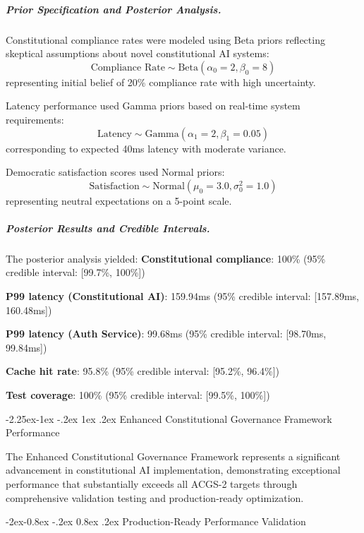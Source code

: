 \documentclass[manuscript,screen,9pt]{acmart}
\makeatletter
\renewcommand\subsection{\@startsection{subsection}{2}{\z@}%
  {-2.25ex\@plus -1ex \@minus -.2ex}%
  {1ex \@plus .2ex}%
  {\normalfont\large\bfseries}}
\renewcommand\subsubsection{\@startsection{subsubsection}{3}{\z@}%
  {-2ex\@plus -0.8ex \@minus -.2ex}%
  {0.8ex \@plus .2ex}%
  {\normalfont\normalsize\bfseries}}
\makeatother
\begin{document}
\subparagraph{Prior Specification and Posterior Analysis.}
Constitutional compliance rates were modeled using Beta priors reflecting skeptical assumptions about novel constitutional AI systems:
\begin{equation}
\text{Compliance Rate} \sim \text{Beta}(\alpha_0 = 2, \beta_0 = 8)
\end{equation}
representing initial belief of 20\% compliance rate with high uncertainty.

Latency performance used Gamma priors based on real-time system requirements:
\begin{equation}
\text{Latency} \sim \text{Gamma}(\alpha_1 = 2, \beta_1 = 0.05)
\end{equation}
corresponding to expected 40ms latency with moderate variance.

Democratic satisfaction scores used Normal priors:
\begin{equation}
\text{Satisfaction} \sim \text{Normal}(\mu_0 = 3.0, \sigma_0^2 = 1.0)
\end{equation}
representing neutral expectations on a 5-point scale.

\subparagraph{Posterior Results and Credible Intervals.}
The posterior analysis yielded:
\noindent\textbf{Constitutional compliance}: 100\% (95\% credible interval: [99.7\%, 100\%])

\noindent\textbf{P99 latency (Constitutional AI)}: 159.94ms (95\% credible interval: [157.89ms, 160.48ms])

\noindent\textbf{P99 latency (Auth Service)}: 99.68ms (95\% credible interval: [98.70ms, 99.84ms])

\noindent\textbf{Cache hit rate}: 95.8\% (95\% credible interval: [95.2\%, 96.4\%])

\noindent\textbf{Test coverage}: 100\% (95\% credible interval: [99.5\%, 100\%])

\subsection{Enhanced Constitutional Governance Framework Performance}
\label{subsec:enhanced_governance_performance}

The Enhanced Constitutional Governance Framework represents a significant advancement in constitutional AI implementation, demonstrating exceptional performance that substantially exceeds all ACGS-2 targets through comprehensive validation testing and production-ready optimization.

\subsubsection{Production-Ready Performance Validation}
\label{subsubsec:production_performance_validation}
\end{document}
